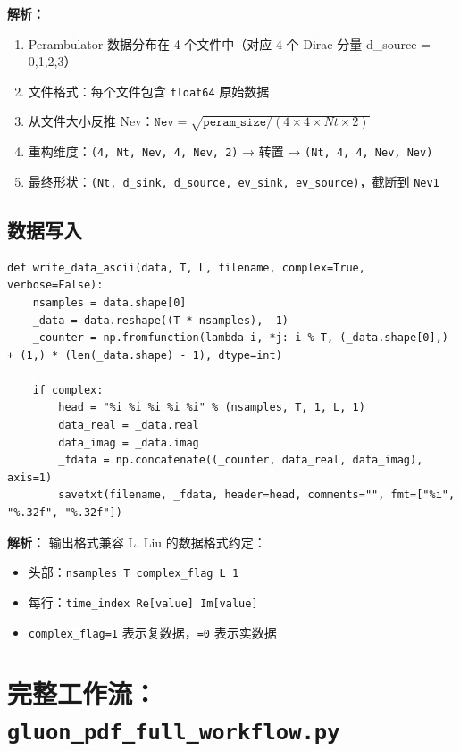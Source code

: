 \documentclass[12pt,a4paper]{ctexart}
\begin{document}
\textbf{解析：}
\begin{enumerate}
    \item Perambulator 数据分布在 4 个文件中（对应 4 个 Dirac 分量 d\_source = 0,1,2,3）
    \item 文件格式：每个文件包含 \texttt{float64} 原始数据
    \item 从文件大小反推 Nev：$\texttt{Nev} = \sqrt{\texttt{peram\_size} / (4 \times 4 \times Nt \times 2)}$
    \item 重构维度：\texttt{(4, Nt, Nev, 4, Nev, 2)} → 转置 → \texttt{(Nt, 4, 4, Nev, Nev)}
    \item 最终形状：\texttt{(Nt, d\_sink, d\_source, ev\_sink, ev\_source)}，截断到 \texttt{Nev1}
\end{enumerate}

\subsection{数据写入}

\begin{lstlisting}[caption={ASCII 格式数据写入（兼容 L. Liu 格式）}]
def write_data_ascii(data, T, L, filename, complex=True, verbose=False):
    nsamples = data.shape[0]
    _data = data.reshape((T * nsamples), -1)
    _counter = np.fromfunction(lambda i, *j: i % T, (_data.shape[0],) + (1,) * (len(_data.shape) - 1), dtype=int)

    if complex:
        head = "%i %i %i %i %i" % (nsamples, T, 1, L, 1)
        data_real = _data.real
        data_imag = _data.imag
        _fdata = np.concatenate((_counter, data_real, data_imag), axis=1)
        savetxt(filename, _fdata, header=head, comments="", fmt=["%i", "%.32f", "%.32f"])
\end{lstlisting}

\textbf{解析：}
输出格式兼容 L. Liu 的数据格式约定：
\begin{itemize}
    \item 头部：\texttt{nsamples T complex\_flag L 1}
    \item 每行：\texttt{time\_index Re[value] Im[value]}
    \item \texttt{complex\_flag=1} 表示复数据，\texttt{=0} 表示实数据
\end{itemize}

\section{完整工作流：\texttt{gluon\_pdf\_full\_workflow.py}}
\label{sec:workflow}
\end{document}
